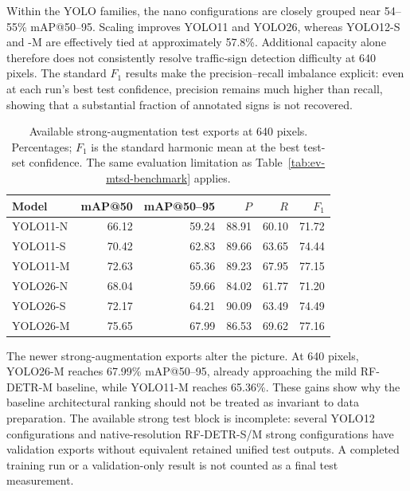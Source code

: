 Within the YOLO families, the nano configurations are closely grouped near 54--55\% \gls{mAP}@50--95. Scaling improves YOLO11 and YOLO26, whereas YOLO12-S and -M are effectively tied at approximately 57.8\%. Additional capacity alone therefore does not consistently resolve traffic-sign detection difficulty at 640 pixels. The standard \(F_1\) results make the precision--recall imbalance explicit: even at each run's best test confidence, precision remains much higher than recall, showing that a substantial fraction of annotated signs is not recovered.

\begin{table}[htbp]
\centering
\small
\caption{Available strong-augmentation test exports at 640 pixels. Percentages; $F_1$ is the standard harmonic mean at the best test-set confidence. The same evaluation limitation as Table~\ref{tab:ev-mtsd-benchmark} applies.}
\label{tab:ev-mtsd-strong}
\renewcommand{\arraystretch}{1.15}
\begin{tabularx}{\textwidth}{@{}>{\raggedright\arraybackslash}Xrrrrr@{}}
\toprule
Model & \gls{mAP}@50 & \gls{mAP}@50--95 & $P$ & $R$ & $F_1$ \\
\midrule
YOLO11-N & 66.12 & 59.24 & 88.91 & 60.10 & 71.72 \\
YOLO11-S & 70.42 & 62.83 & 89.66 & 63.65 & 74.44 \\
YOLO11-M & 72.63 & 65.36 & 89.23 & 67.95 & 77.15 \\
YOLO26-N & 68.04 & 59.66 & 84.02 & 61.77 & 71.20 \\
YOLO26-S & 72.17 & 64.21 & 90.09 & 63.49 & 74.49 \\
YOLO26-M & 75.65 & 67.99 & 86.53 & 69.62 & 77.16 \\
\bottomrule
\end{tabularx}
\end{table}


The newer strong-augmentation exports alter the picture. At 640 pixels, YOLO26-M reaches 67.99\% \gls{mAP}@50--95, already approaching the mild RF-DETR-M baseline, while YOLO11-M reaches 65.36\%. These gains show why the baseline architectural ranking should not be treated as invariant to data preparation. The available strong test block is incomplete: several YOLO12 configurations and native-resolution RF-DETR-S/M strong configurations have validation exports without equivalent retained unified test outputs. A completed training run or a validation-only result is not counted as a final test measurement.

